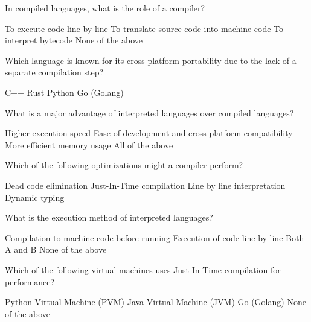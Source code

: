 \documentclass[12pt, addpoints, answers]{exam}
\begin{document}
\begin{questions}
	\question In compiled languages, what is the role of a compiler?
	\begin{choices}
		\choice To execute code line by line
		\CorrectChoice To translate source code into machine code
		\choice To interpret bytecode
		\choice None of the above
	\end{choices}
				
	\question Which language is known for its cross-platform portability due to the lack of a separate compilation step?
	\begin{choices}
		\choice C++
		\choice Rust
		\CorrectChoice Python
		\choice Go (Golang)
	\end{choices}
				
	\question What is a major advantage of interpreted languages over compiled languages?
	\begin{choices}
		\choice Higher execution speed
		\CorrectChoice Ease of development and cross-platform compatibility
		\choice More efficient memory usage
		\choice All of the above
	\end{choices}
				
	\question Which of the following optimizations might a compiler perform?
	\begin{choices}
		\CorrectChoice Dead code elimination
		\choice Just-In-Time compilation
		\choice Line by line interpretation
		\choice Dynamic typing
	\end{choices}
				
	\question What is the execution method of interpreted languages?
	\begin{choices}
		\choice Compilation to machine code before running
		\CorrectChoice Execution of code line by line
		\choice Both A and B
		\choice None of the above
	\end{choices}
				
	\question Which of the following virtual machines uses Just-In-Time compilation for performance?
	\begin{choices}
		\choice Python Virtual Machine (PVM)
		\CorrectChoice Java Virtual Machine (JVM)
		\choice Go (Golang)
		\choice None of the above
	\end{choices}
				

		
						

				
				

\end{questions}
\end{document}
